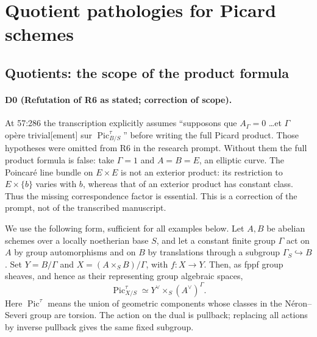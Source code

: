 \section{Quotient pathologies for Picard schemes}
\subsection{Quotients: the scope of the product formula}
\paragraph{D0 (Refutation of R6 as stated; correction of scope).}
At 57:286 the transcription explicitly assumes
``supposons que $A_{\Gamma}=0$ \dots et $\Gamma$ opère trivial[ement]
sur $\operatorname{Pic}^{\tau}_{B/S}$'' before writing the full Picard product.
Those hypotheses were omitted from R6 in the research prompt.  Without them
the full product formula is false: take $\Gamma=1$ and $A=B=E$, an elliptic
curve.  The Poincaré line bundle on $E\times E$ is not an exterior product:
its restriction to $E\times\{b\}$ varies with $b$, whereas that of an
exterior product has constant class.  Thus the missing correspondence
factor is essential.  This is a correction of the prompt, not of the
transcribed manuscript.

We use the following form, sufficient for all examples below.  Let $A,B$
be abelian schemes over a locally noetherian base $S$, and let a constant
finite group $\Gamma$ act on $A$ by group automorphisms and on $B$ by
translations through a subgroup $\Gamma_S\hookrightarrow B$.  Set
$Y=B/\Gamma$ and $X=(A\times_S B)/\Gamma$, with $f:X\to Y$.  Then, as fppf
group sheaves, and hence as their representing group algebraic spaces,
\begin{equation}\label{dgj:pic-tau}
 \operatorname{Pic}^{\tau}_{X/S}
 \simeq Y^\vee\times_S(A^\vee)^\Gamma.
\end{equation}
Here $\operatorname{Pic}^{\tau}$ means the union of geometric components
whose classes in the Néron--Severi group are torsion.  The action on the
dual is pullback; replacing all actions by inverse pullback gives the
same fixed subgroup.

